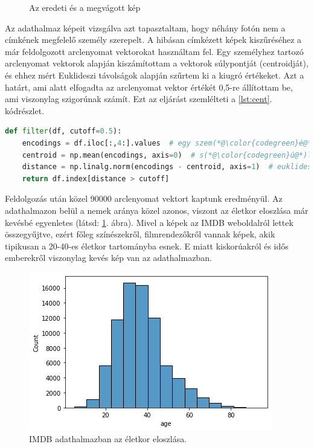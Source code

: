 \begin{figure}[ht]
\begin{subfigure}[b]{0.45\columnwidth}
     \end{subfigure}
        \caption{Az eredeti és a megvágott kép}
\end{figure}


Az adathalmaz képeit vizsgálva azt tapasztaltam, hogy néhány fotón nem a címkének megfelelő személy szerepelt. A hibásan címkézett képek kiszűréséhez a már feldolgozott arclenyomat vektorokat használtam fel. Egy személyhez tartozó arclenyomat vektorok alapján kiszámítottam a vektorok súlypontját (centroidját), és ehhez mért Euklideszi távolságok alapján szűrtem ki a kiugró értékeket. Azt a határt, ami alatt elfogadta az arclenyomat vektor értékét 0,5-re állítottam be, ami viszonylag szigorúnak számít. Ezt az eljárást szemlélteti a \ref{lst:cent}. kódrészlet.

\begin{lstlisting}[language=python, caption={Arclenyomatok szűrése távolság alapján.}, label=lst:cent]
def filter(df, cutoff=0.5):
	encodings = df.iloc[:,4:].values  # egy szem(*@\color{codegreen}é@*)lyhez tartoz(*@\color{codegreen}ó@*) arclenyomatok
	centroid = np.mean(encodings, axis=0)  # s(*@\color{codegreen}ú@*)lypont sz(*@\color{codegreen}á@*)m(*@\color{codegreen}í@*)t(*@\color{codegreen}á@*)s
	distance = np.linalg.norm(encodings - centroid, axis=1)  # euklideszi t(*@\color{codegreen}á@*)vols(*@\color{codegreen}á@*)g
	return df.index[distance > cutoff]
\end{lstlisting}

Feldolgozás után közel 90000 arclenyomat vektort kaptunk eredményül. Az adathalmazon belül a nemek aránya közel azonos, viszont az életkor eloszlása már kevésbé egyenletes (látsd: \ref{fig:agedist}. ábra). Mivel a képek az IMDB weboldalról lettek összegyűjtve, ezért főleg színészekről, filmrendezőkről vannak képek, akik tipikusan a 20-40-es életkor tartományba esnek. E miatt kiskorúakról és idős emberekről viszonylag kevés kép van az adathalmazban.

\begin{figure}[ht]
	\centering
	\includegraphics[width=0.7\columnwidth]{figures/IMDB_age_dist.png}
	\caption{IMDB adathalmazban az életkor eloszlása.}
	\label{fig:agedist}
\end{figure}



